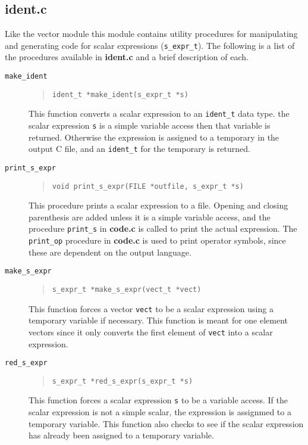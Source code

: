 \subsection{\bf ident.c}
Like the vector module this module contains utility procedures for manipulating
and generating code for scalar expressions ({\tt s\_expr\_t}).  The following is a
list of the procedures available in {\bf ident.c} and
a brief description of each.
\begin{description}

\item[{\tt make\_ident}]
\begin{quote}
\begin{verbatim}
ident_t *make_ident(s_expr_t *s)
\end{verbatim}
\end{quote}
This function converts a scalar expression to an {\tt ident\_t} data type.
the scalar expression {\tt s} is a simple variable access then
that variable is returned.  Otherwise the expression is assigned to a temporary
in the output C file, and an {\tt ident\_t} for the temporary is returned.

\item[{\tt print\_s\_expr}]
\begin{quote}
\begin{verbatim}
void print_s_expr(FILE *outfile, s_expr_t *s)
\end{verbatim}
\end{quote}
This procedure prints a scalar expression to a file.  Opening and closing
parenthesis are added unless it is a simple variable access, and the
procedure {\tt print\_s} in {\bf code.c} is called to print the actual
expression.  The {\tt print\_op}
procedure in {\bf code.c} is used to print operator symbols, since these
are dependent on the output language.

\item[{\tt make\_s\_expr}]
\begin{quote}
\begin{verbatim}
s_expr_t *make_s_expr(vect_t *vect)
\end{verbatim}
\end{quote}
This function forces a vector {\tt vect} to be a scalar expression using a 
temporary variable if necessary.  This function is meant for one element
vectors since it only converts the first element of {\tt vect} into a 
scalar expression.

\item[{\tt red\_s\_expr}]
\begin{quote}
\begin{verbatim}
s_expr_t *red_s_expr(s_expr_t *s)
\end{verbatim}
\end{quote}
This function forces a scalar expression {\tt s} to be a variable access.
If the scalar expression is not a simple scalar, the expression is
assignmed to a temporary variable.  This function also checks to see if
the scalar expression has already been assigned to a temporary
variable.


\end{description}
